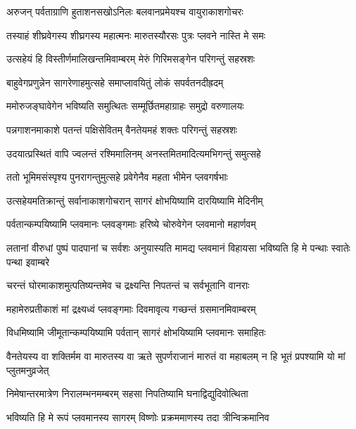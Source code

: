 \twolineshloka
{अरुजन् पर्वताग्राणि हुताशनसखोऽनिलः}
{बलवानप्रमेयश्च वायुराकाशगोचरः} %

\twolineshloka
{तस्याहं शीघ्रवेगस्य शीघ्रगस्य महात्मनः}
{मारुतस्यौरसः पुत्रः प्लवने नास्ति मे समः} %

\twolineshloka
{उत्सहेयं हि विस्तीर्णमालिखन्तमिवाम्बरम्}
{मेरुं गिरिमसङ्गेन परिगन्तुं सहस्रशः} %

\twolineshloka
{बाहुवेगप्रणुन्नेन सागरेणाहमुत्सहे}
{समाप्लावयितुं लोकं सपर्वतनदीह्रदम्} %

\twolineshloka
{ममोरुजङ्घावेगेन भविष्यति समुत्थितः}
{सम्मूर्छितमहाग्राहः समुद्रो वरुणालयः} %

\twolineshloka
{पन्नगाशनमाकाशे पतन्तं पक्षिसेवितम्}
{वैनतेयमहं शक्तः परिगन्तुं सहस्रशः} %

\twolineshloka
{उदयात्प्रस्थितं वापि ज्वलन्तं रश्मिमालिनम्}
{अनस्तमितमादित्यमभिगन्तुं समुत्सहे} %

\twolineshloka
{ततो भूमिमसंस्पृश्य पुनरागन्तुमुत्सहे}
{प्रवेगेनैव महता भीमेन प्लवगर्षभाः} %

\twolineshloka
{उत्सहेयमतिक्रान्तुं सर्वानाकाशगोचरान्}
{सागरं क्षोभयिष्यामि दारयिष्यामि मेदिनीम्} %

\twolineshloka
{पर्वतान्कम्पयिष्यामि प्लवमानः प्लवङ्गमाः}
{हरिष्ये चोरुवेगेन प्लवमानो महार्णवम्} %

\threelineshloka
{लतानां वीरुधां पुष्पं पादपानां च सर्वशः}
{अनुयास्यति मामद्य प्लवमानं विहायसा}
{भविष्यति हि मे पन्थाः स्वातेः पन्था इवाम्बरे} %

\twolineshloka
{चरन्तं घोरमाकाशमुत्पतिष्यन्तमेव च}
{द्रक्ष्यन्ति निपतन्तं च सर्वभूतानि वानराः} %

\twolineshloka
{महामेरुप्रतीकाशं मां द्रक्ष्यध्वं प्लवङ्गमाः}
{दिवमावृत्य गच्छन्तं ग्रसमानमिवाम्बरम्} %

\twolineshloka
{विधमिष्यामि जीमूतान्कम्पयिष्यामि पर्वतान्}
{सागरं क्षोभयिष्यामि प्लवमानः समाहितः} %

\threelineshloka
{वैनतेयस्य वा शक्तिर्मम वा मारुतस्य वा}
{ऋते सुपर्णराजानं मारुतं वा महाबलम्}
{न हि भूतं प्रपश्यामि यो मां प्लुतमनुव्रजेत्} %

\twolineshloka
{निमेषान्तरमात्रेण निरालम्भनमम्बरम्}
{सहसा निपतिष्यामि घनाद्विद्युदिवोत्थिता} %

\twolineshloka
{भविष्यति हि मे रूपं प्लवमानस्य सागरम्}
{विष्णोः प्रक्रममाणस्य तदा त्रीन्विक्रमानिव} %

